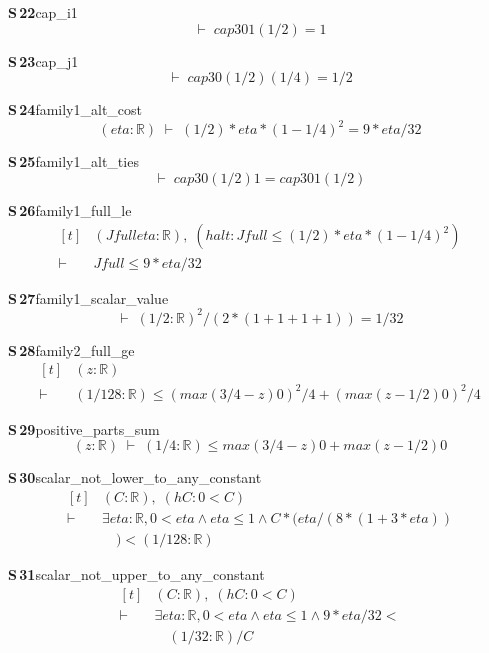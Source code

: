\documentclass[conference]{IEEEtran}
\theoremstyle{definition}
\newcommand{\lean}[1]{\textsf{\footnotesize #1}}
\begin{document}
\noindent\textbf{S\,22}\quad\lean{cap\_i1}
{\footnotesize\[ \vdash\; \mathit{cap3} 0 1 (1/2) = 1 \]}

\noindent\textbf{S\,23}\quad\lean{cap\_j1}
{\footnotesize\[ \vdash\; \mathit{cap3} 0 (1/2) (1/4) = 1/2 \]}

\noindent\textbf{S\,24}\quad\lean{family1\_alt\_cost}
{\footnotesize\[ (\mathit{eta} : \mathbb{R} ) \;\vdash\; (1/2) * \mathit{eta} * (1 - 1/4) ^{2} = 9 * \mathit{eta} / 32 \]}

\noindent\textbf{S\,25}\quad\lean{family1\_alt\_ties}
{\footnotesize\[ \vdash\; \mathit{cap3} 0 (1/2) 1 = \mathit{cap3} 0 1 (1/2) \]}

\noindent\textbf{S\,26}\quad\lean{family1\_full\_le}
{\footnotesize\[ \begin{aligned}[t]
&(\mathit{Jfull} \mathit{eta} : \mathbb{R} ),\; (\mathit{halt} : \mathit{Jfull} \leq (1/2) * \mathit{eta} * (1 - 1/4) ^{2})\\
\vdash\;&\mathit{Jfull} \leq 9 * \mathit{eta} / 32
\end{aligned} \]}

\noindent\textbf{S\,27}\quad\lean{family1\_scalar\_value}
{\footnotesize\[ \vdash\; (1/2 : \mathbb{R} ) ^{2} / (2 * (1 + 1 + 1 + 1)) = 1 / 32 \]}

\noindent\textbf{S\,28}\quad\lean{family2\_full\_ge}
{\footnotesize\[ \begin{aligned}[t]
&(\mathit{z} : \mathbb{R} )\\
\vdash\;&(1/128 : \mathbb{R} ) \leq (\mathit{max} (3/4 - \mathit{z}) 0) ^{2} / 4 + (\mathit{max} (\mathit{z} - 1/2) 0) ^{2} / 4
\end{aligned} \]}

\noindent\textbf{S\,29}\quad\lean{positive\_parts\_sum}
{\footnotesize\[ (\mathit{z} : \mathbb{R} ) \;\vdash\; (1/4 : \mathbb{R} ) \leq \mathit{max} (3/4 - \mathit{z}) 0 + \mathit{max} (\mathit{z} - 1/2) 0 \]}

\noindent\textbf{S\,30}\quad\lean{scalar\_not\_lower\_to\_any\_constant}
{\footnotesize\[ \begin{aligned}[t]
&(\mathit{C} : \mathbb{R} ),\; (\mathit{hC} : 0 < \mathit{C})\\
\vdash\;&\exists \mathit{eta} : \mathbb{R} , 0 < \mathit{eta} \wedge \mathit{eta} \leq 1 \wedge \mathit{C} * (\mathit{eta} / (8 * (1 + 3 * \mathit{eta}))\\
&\quad ) < (1 / 128 : \mathbb{R} )
\end{aligned} \]}

\noindent\textbf{S\,31}\quad\lean{scalar\_not\_upper\_to\_any\_constant}
{\footnotesize\[ \begin{aligned}[t]
&(\mathit{C} : \mathbb{R} ),\; (\mathit{hC} : 0 < \mathit{C})\\
\vdash\;&\exists \mathit{eta} : \mathbb{R} , 0 < \mathit{eta} \wedge \mathit{eta} \leq 1 \wedge 9 * \mathit{eta} / 32 <\\
&\quad (1 / 32 : \mathbb{R} ) / \mathit{C}
\end{aligned} \]}
\end{document}
